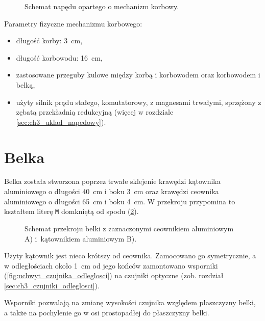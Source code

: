 \begin{figure}[H]
	\centering
	
	\caption{Schemat napędu opartego o mechanizm korbowy.}
	\label{fig:mechanizm_korbowy}
\end{figure}

Parametry fizyczne mechanizmu korbowego:

\begin{itemize}
	\item długość korby: \SI{3}{cm},
	\item długość korbowodu: \SI{16}{cm},
	\item zastosowane przeguby kulowe między korbą i korbowodem oraz korbowodem i belką,
    \item użyty silnik prądu stałego, komutatorowy, z magnesami trwałymi, sprzężony z zębatą przekładnią redukcyjną (więcej w rozdziale \ref{sec:ch3_uklad_napedowy}).
\end{itemize}


\section{Belka}
\label{sec:ch2_belka}

Belka została stworzona poprzez trwałe sklejenie krawędzi kątownika aluminiowego o długości \SI{40}{cm} i boku \SI{3}{cm} oraz krawędzi ceownika aluminiowego o długości \SI{65}{cm} i boku \SI{4}{cm}. W przekroju przypomina to kształtem literę \texttt{M} domkniętą od spodu (\cref{fig:przekroj_belki}).

\begin{figure}[H]
	\centering
	
	\caption{Schemat przekroju belki z zaznaczonymi ceownikiem aluminiowym A) i~kątownikiem aluminiowym B).}
	\label{fig:przekroj_belki}
\end{figure}

Użyty kątownik jest nieco krótszy od ceownika. Zamocowano go symetrycznie, a w odległościach około \SI{1}{cm} od jego końców zamontowano wsporniki (\cref{fig:uchwyt_czujnika_odleglosci}) na czujniki optyczne (zob. rozdział \ref{sec:ch3_czujniki_odleglosci}).

Wsporniki pozwalają na zmianę wysokości czujnika względem płaszczyzny belki, a także na pochylenie go w osi prostopadłej do płaszczyzny belki.

